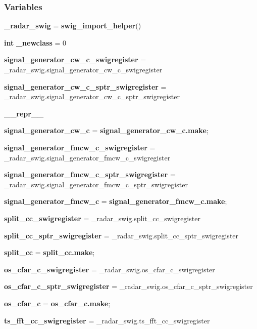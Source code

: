 \subsubsection*{Variables}
\begin{DoxyCompactItemize}
\item 
{\bf \+\_\+radar\+\_\+swig} = {\bf swig\+\_\+import\+\_\+helper}()
\item 
{\bf int} {\bf \+\_\+newclass} = 0
\item 
{\bf signal\+\_\+generator\+\_\+cw\+\_\+c\+\_\+swigregister} = \+\_\+radar\+\_\+swig.\+signal\+\_\+generator\+\_\+cw\+\_\+c\+\_\+swigregister
\item 
{\bf signal\+\_\+generator\+\_\+cw\+\_\+c\+\_\+sptr\+\_\+swigregister} = \+\_\+radar\+\_\+swig.\+signal\+\_\+generator\+\_\+cw\+\_\+c\+\_\+sptr\+\_\+swigregister
\item 
{\bf \+\_\+\+\_\+repr\+\_\+\+\_\+}
\item 
{\bf signal\+\_\+generator\+\_\+cw\+\_\+c} = {\bf signal\+\_\+generator\+\_\+cw\+\_\+c.\+make};
\item 
{\bf signal\+\_\+generator\+\_\+fmcw\+\_\+c\+\_\+swigregister} = \+\_\+radar\+\_\+swig.\+signal\+\_\+generator\+\_\+fmcw\+\_\+c\+\_\+swigregister
\item 
{\bf signal\+\_\+generator\+\_\+fmcw\+\_\+c\+\_\+sptr\+\_\+swigregister} = \+\_\+radar\+\_\+swig.\+signal\+\_\+generator\+\_\+fmcw\+\_\+c\+\_\+sptr\+\_\+swigregister
\item 
{\bf signal\+\_\+generator\+\_\+fmcw\+\_\+c} = {\bf signal\+\_\+generator\+\_\+fmcw\+\_\+c.\+make};
\item 
{\bf split\+\_\+cc\+\_\+swigregister} = \+\_\+radar\+\_\+swig.\+split\+\_\+cc\+\_\+swigregister
\item 
{\bf split\+\_\+cc\+\_\+sptr\+\_\+swigregister} = \+\_\+radar\+\_\+swig.\+split\+\_\+cc\+\_\+sptr\+\_\+swigregister
\item 
{\bf split\+\_\+cc} = {\bf split\+\_\+cc.\+make};
\item 
{\bf os\+\_\+cfar\+\_\+c\+\_\+swigregister} = \+\_\+radar\+\_\+swig.\+os\+\_\+cfar\+\_\+c\+\_\+swigregister
\item 
{\bf os\+\_\+cfar\+\_\+c\+\_\+sptr\+\_\+swigregister} = \+\_\+radar\+\_\+swig.\+os\+\_\+cfar\+\_\+c\+\_\+sptr\+\_\+swigregister
\item 
{\bf os\+\_\+cfar\+\_\+c} = {\bf os\+\_\+cfar\+\_\+c.\+make};
\item 
{\bf ts\+\_\+fft\+\_\+cc\+\_\+swigregister} = \+\_\+radar\+\_\+swig.\+ts\+\_\+fft\+\_\+cc\+\_\+swigregister

\end{DoxyCompactItemize}

